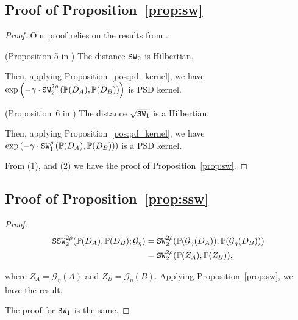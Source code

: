 \subsection{Proof of Proposition~\ref{prop:sw}}
\begin{proof}
Our proof relies on the results from \cite{meunier2022slicedw}.
\begin{proposition}(Proposition 5 in \cite{meunier2022slicedw})
  The distance $\operatorname{\texttt{SW}}_2$ is Hilbertian.  
\end{proposition}
Then, applying Proposition~\ref{pos:pd_kernel}, we have  $\exp\left(-\gamma \cdot \operatorname{\texttt{SW}}_2^{2\rho}\left(\mathbb{P}(D_A), \mathbb{P}(D_B)\right)\right)$ is PSD kernel.
\begin{proposition}(Proposition~6 in \cite{meunier2022slicedw} )
  The distance $\sqrt{\operatorname{\texttt{SW}}_1}$ is a Hilbertian.  
\end{proposition}

Then, applying Proposition~\ref{pos:pd_kernel}, we have  $\exp\left(-\gamma \cdot \operatorname{\texttt{SW}}_1^{\rho}\left(\mathbb{P}(D_A), \mathbb{P}(D_B)\right)\right)$ is  a PSD kernel.

From (1), and (2) we have the proof of Proposition~\ref{prop:sw}.


\end{proof}
\subsection{Proof of Proposition~\ref{prop:ssw}}\label{app:proof_ssw}
\begin{proof}
\begin{align*}
\operatorname{\texttt{SSW}}_2^{2 \rho}(\mathbb{P}(D_A), \mathbb{P}(D_B); \mathcal{G}_{\eta}) &= {\operatorname{\texttt{SW}}}_2^{2\rho}(\mathbb{P}(\mathcal{G}_{\eta}(D_A)), \mathbb{P}(\mathcal{G}_{\eta}(D_B))) \\
&= {\operatorname{\texttt{SW}}}_2^{2\rho}(\mathbb{P}(Z_A), \mathbb{P}(Z_B)), 
\end{align*}    

where $Z_A = \mathcal{G}_{\eta}(A)$ and $Z_B = \mathcal{G}_{\eta}(B)$. Applying Proposition~\ref{prop:sw}, we have the result.

The proof for $\operatorname{\texttt{SW}}_1$ is the same.
\end{proof}

